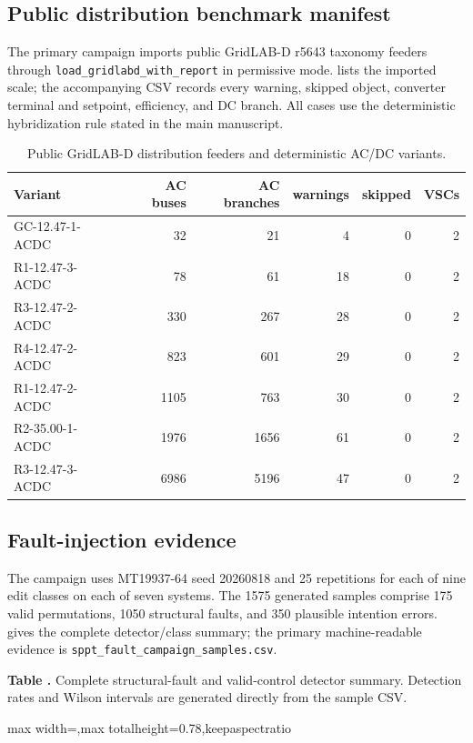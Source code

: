 \documentclass[preprint,12pt,a4paper]{elsarticle}
\newcommand{\code}[1]{\texttt{#1}}
\begin{document}
\subsection{Public distribution benchmark manifest}

The primary campaign imports public GridLAB-D r5643 taxonomy feeders through
\code{load\_gridlabd\_with\_report} in permissive mode. 
lists the imported scale; the accompanying CSV records every warning, skipped
object, converter terminal and setpoint, efficiency, and DC branch. All cases use
the deterministic hybridization rule stated in the main manuscript.

\begin{table}[H]
\centering
\caption{Public GridLAB-D distribution feeders and deterministic AC/DC variants.}
\label{sup:tab-public}
\small
\begin{tabular}{@{}lrrrrr@{}}
\toprule
Variant & AC buses & AC branches & warnings & skipped & VSCs \\
\midrule
GC-12.47-1-ACDC & 32 & 21 & 4 & 0 & 2 \\
R1-12.47-3-ACDC & 78 & 61 & 18 & 0 & 2 \\
R3-12.47-2-ACDC & 330 & 267 & 28 & 0 & 2 \\
R4-12.47-2-ACDC & 823 & 601 & 29 & 0 & 2 \\
R1-12.47-2-ACDC & 1105 & 763 & 30 & 0 & 2 \\
R2-35.00-1-ACDC & 1976 & 1656 & 61 & 0 & 2 \\
R3-12.47-3-ACDC & 6986 & 5196 & 47 & 0 & 2 \\
\bottomrule
\end{tabular}
\end{table}

\subsection{Fault-injection evidence}

The campaign uses MT19937-64 seed 20260818 and 25 repetitions for each of nine
edit classes on each of seven systems. The 1575 generated samples comprise 175
valid permutations, 1050 structural faults, and 350 plausible intention errors.
 gives the complete detector/class summary; the primary
machine-readable evidence is \code{sppt\_fault\_campaign\_samples.csv}.

\begin{landscape}
\centering
{}
\noindent\textbf{Table \thetable.} Complete structural-fault and valid-control detector summary. Detection
rates and Wilson intervals are generated directly from the sample CSV.
\label{sup:tab-faults}
\par\medskip
\begin{adjustbox}{max width=\linewidth,max totalheight=0.78\textheight,keepaspectratio}

\end{adjustbox}
\end{landscape}
\end{document}
